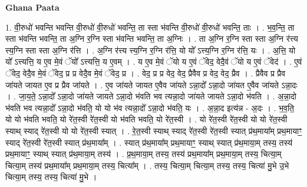 \documentclass[17pt]{extarticle}
\begin{document}
\textbf{Ghana Paata } \newline

1. वी॒रुधो॑ भवन्ति भवन्ति वी॒रुधो॑ वी॒रुधो॑ भवन्ति॒ ता स्ता भ॑वन्ति वी॒रुधो॑ वी॒रुधो॑ भवन्ति॒ ताः । . भ॒व॒न्ति॒ ता स्ता भ॑वन्ति भवन्ति॒ ता अ॒ग्नि र॒ग्नि स्ता भ॑वन्ति भवन्ति॒ ता अ॒ग्निः । . ता अ॒ग्नि र॒ग्नि स्ता स्ता अ॒ग्नि र॑त्त्य त्त्य॒ग्नि स्ता स्ता अ॒ग्नि र॑त्ति । . अ॒ग्नि र॑त्त्य त्त्य॒ग्नि र॒ग्नि र॑त्ति॒ यो यो᳚ ऽत्त्य॒ग्नि र॒ग्नि र॑त्ति॒ यः । . अ॒त्ति॒ यो यो᳚ ऽत्त्यत्ति॒ य ए॒व मे॒वं ॅयो᳚ ऽत्त्यत्ति॒ य ए॒वम् । . य ए॒व मे॒वं ॅयो य ए॒वं ॅवेद॒ वेदै॒वं ॅयो य ए॒वं ॅवेद॑ । . ए॒वं ॅवेद॒ वेदै॒व मे॒वं ॅवेद॒ प्र प्र वेदै॒व मे॒वं ॅवेद॒ प्र । . वेद॒ प्र प्र वेद॒ वेद॒ प्रैवैव प्र वेद॒ वेद॒ प्रैव । . प्रैवैव प्र प्रैव जा॑यते जायत ए॒व प्र प्रैव जा॑यते । . ए॒व जा॑यते जायत ए॒वैव जा॑यते ऽन्ना॒दो᳚ ऽन्ना॒दो जा॑यत ए॒वैव जा॑यते ऽन्ना॒दः । . जा॒य॒ते॒ ऽन्ना॒दो᳚ ऽन्ना॒दो जा॑यते जायते ऽन्ना॒दो भ॑वति भव त्यन्ना॒दो जा॑यते जायते ऽन्ना॒दो भ॑वति । . अ॒न्ना॒दो भ॑वति भव त्यन्ना॒दो᳚ ऽन्ना॒दो भ॑वति॒ यो यो भ॑व त्यन्ना॒दो᳚ ऽन्ना॒दो भ॑वति॒ यः । . अ॒न्ना॒द इत्य॑न्न - अ॒दः । . भ॒व॒ति॒ यो यो भ॑वति भवति॒ यो रे॑त॒स्वी रे॑त॒स्वी यो भ॑वति भवति॒ यो रे॑त॒स्वी । . यो रे॑त॒स्वी रे॑त॒स्वी यो यो रे॑त॒स्वी स्याथ् स्याद् रे॑त॒स्वी यो यो रे॑त॒स्वी स्यात् । . रे॒त॒स्वी स्याथ् स्याद् रे॑त॒स्वी रे॑त॒स्वी स्यात् प्र॑थ॒माया᳚म् प्रथ॒मायाꣳ॒॒ स्याद् रे॑त॒स्वी रे॑त॒स्वी स्यात् प्र॑थ॒माया᳚म् । . स्यात् प्र॑थ॒माया᳚म् प्रथ॒मायाꣳ॒॒ स्याथ् स्यात् प्र॑थ॒माया॒म् तस्य॒ तस्य॑ प्रथ॒मायाꣳ॒॒ स्याथ् स्यात् प्र॑थ॒माया॒म् तस्य॑ । . प्र॒थ॒माया॒म् तस्य॒ तस्य॑ प्रथ॒माया᳚म् प्रथ॒माया॒म् तस्य॒ चित्या॒म् चित्या॒म् तस्य॑ प्रथ॒माया᳚म् प्रथ॒माया॒म् तस्य॒ चित्या᳚म् । . तस्य॒ चित्या॒म् चित्या॒म् तस्य॒ तस्य॒ चित्या॑ मु॒भे उ॒भे चित्या॒म् तस्य॒ तस्य॒ चित्या॑ मु॒भे । \newline
\end{document}
